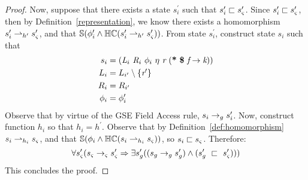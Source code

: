 \begin{proof}
Now, suppose that there exists a state $s_i^\prime$ such that $s_i^\prime \sqsubset s_{\varsigma}^\prime$. Since $s_i^\prime \sqsubset s_{\varsigma}^\prime$, then by Definition~\ref{representation}, we know there exists a homomorphism $s_i^\prime \rightharpoonup_{h^\prime} s_{\varsigma}^\prime$, and that $\mathbb{S}( \phi_i^\prime \wedge \mathbb{HC}(s_i^\prime \rightharpoonup_{h^\prime} s_{\varsigma}^\prime) )$. From state $s_i^\prime$, construct state $s_i$ such that 
\begin{align*}
s_i &= \lp \cfgnt{L}_{i}\ \cfgnt{R}_{i}\ \phi_i\ \eta\ \cfgnt{r}\ \lp \cfgt{*}\ \cfgt{\$}\ \cfgnt{f} \rightarrow \cfgnt{k}\rp \rp\\
L_i &= L_{i^\prime} \setminus \{\cfgnt{r}^\prime \}\\
R_i &= R_{i^\prime}\\
\phi_i &= \phi_i^\prime
\end{align*}
Observe that by virtue of the GSE Field Access rule, $s_i \rightarrow_{g} s_i^\prime$. Now, construct function $h_i$ so that $h_i = h^\prime$. Observe that by Definition~\ref{def:homomorphism} $s_i \rightharpoonup_{h_i} s_{\varsigma}$,  and that $\mathbb{S}( \phi_i \wedge \mathbb{HC}(s_i \rightharpoonup_{h_i} s_{\varsigma}) )$, so $s_i \sqsubset s_{\varsigma}$. Therefore:
\begin{equation}
\forall s_{\varsigma}^\prime ( s_{\varsigma} \rightarrow_{\varsigma} s_{\varsigma}^\prime\Rightarrow \exists s_{g}^\prime( (s_{g} \rightarrow_{g} s_{g}^\prime )\wedge (s_{g}^\prime\ \sqsubset\ s_{\varsigma}^\prime ))  )
\end{equation}
 This concludes the proof.
\end{proof}

